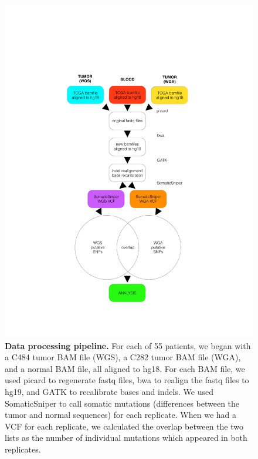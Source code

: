\documentclass[11pt]{article} %
\begin{document}
{%
\begin{figure}
\centerline{
\includegraphics[width=5in]{pipeline.pdf} }
\caption{\textbf{Data processing pipeline.} For each of 55 patients, we began with a C484 tumor BAM file (WGS), a C282 tumor BAM file (WGA), and a normal BAM file, all aligned to hg18. For each BAM file, we used picard to regenerate fastq files, bwa to realign the fastq files to hg19, and GATK to recalibrate bases and indels. We used SomaticSniper to call somatic mutations (differences between the tumor and normal sequences) for each replicate. When we had a VCF for each replicate, we calculated the overlap between the two lists as the number of individual mutations which appeared in both replicates.}
\label{fig:pipeline}
\end{figure}

}
\end{document}
